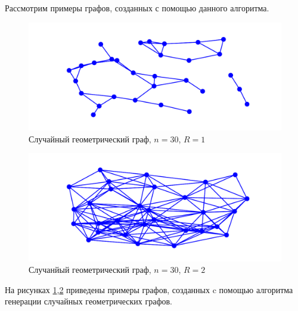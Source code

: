 Рассмотрим примеры графов, созданных с помощью данного алгоритма.
\begin{figure}[H] 
    \includegraphics{geo301.pdf} 
    \caption{Случайный геометрический граф, $n=30$,  $R=1$}
    \label{geoex_1}
\end{figure} 
\begin{figure}[H] 
    \includegraphics{geo302.pdf} 
    \caption{Случанйый геометрический граф, $n=30$,  $R=2$}
    \label{geoex_2}
\end{figure} 
На рисунках \ref{geoex_1},\ref{geoex_2} приведены 
примеры графов, созданных c помощью алгоритма генерации
случайных геометрических графов.
